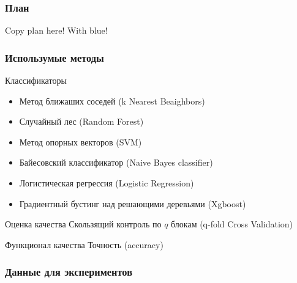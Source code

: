 \documentclass{beamer}
\begin{document}
\begin{frame}
\frametitle{План}
Copy plan here! With blue!
\end{frame}

\begin{frame}
\frametitle{Использумые методы}
\begin{block}{Классификаторы}
\begin{itemize}
    \item Метод ближаших соседей (k Nearest Beaighbors)
    \item Случайный лес (Random Forest)
    \item Метод опорных векторов (SVM)
    \item Байесовский классификатор (Naive Bayes classifier)
    \item Логистическая регрессия (Logistic Regression)
    \item Градиентный бустинг над решающими деревьями (Xgboost)
\end{itemize}
\end{block}
\begin{block}{Оценка качества}
Скользящий контроль по $q$ блокам (q-fold Cross Validation)
\end{block}
\begin{block}{Функционал качества}
Точность (accuracy)
\end{block}
\end{frame}

\begin{frame}
\frametitle{Данные для экспериментов}
\end{frame}
\end{document}
